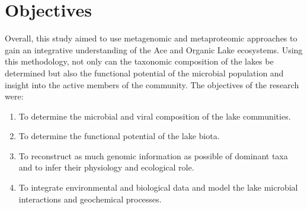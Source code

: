 \documentclass{book}
\begin{document}
\section{Objectives}

Overall, this study aimed to use metagenomic and metaproteomic approaches to gain an integrative understanding of the Ace and Organic Lake ecosystems. 
Using this methodology, not only can the taxonomic composition of the lakes be determined but also the functional potential of the microbial population and insight into the active members of the community.
The objectives of the research were:

\begin{enumerate}
\item
  To determine the microbial and viral composition of the lake
  communities.

\item
  To determine the functional potential of the lake biota.

\item
  To reconstruct as much genomic information as possible of dominant taxa and to infer their physiology and ecological role.

\item
  To integrate environmental and biological data and model the lake microbial interactions and geochemical processes.

\end{enumerate}
\end{document}
